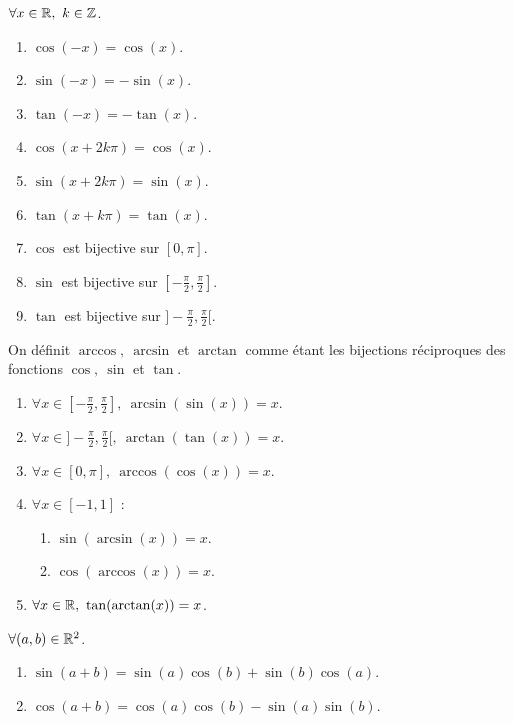 \begin{proposition}
	$\forall x \in \mathbb{R},\ k \in \mathbb{Z}$.
	\begin{enumerate}
		\item $\cos(-x) = \cos(x)$.
		\item $\sin(-x) = -\sin(x)$.
		\item $\tan(-x) = -\tan(x)$.
		\item $\cos(x + 2k\pi) = \cos(x)$.
		\item $\sin(x + 2k\pi) = \sin(x)$.
		\item $\tan(x + k\pi) = \tan(x)$.
		\item $\cos$ est bijective sur $[0, \pi]$.
		\item $\sin$ est bijective sur $[-\frac{\pi}{2}, \frac{\pi}{2}]$.
		\item $\tan$ est bijective sur $]-\frac{\pi}{2}, \frac{\pi}{2}[$.
	\end{enumerate}
\end{proposition}

\begin{definition}
	On définit $\arccos,\ \arcsin$ et $\arctan$ comme étant les bijections réciproques des fonctions $\cos,\ \sin$ et $\tan$.
\end{definition}

\begin{proposition}\leavevmode
    \begin{enumerate}
    	\item $\forall x \in [-\frac{\pi}{2}, \frac{\pi}{2}],\ \arcsin(\sin(x)) = x$.
        \item $\forall x \in ]-\frac{\pi}{2}, \frac{\pi}{2}[,\ \arctan(\tan(x)) = x$.
        \item $\forall x \in [0, \pi],\ \arccos(\cos(x)) = x$.
        \item $\forall x \in [-1, 1]$ :
        \begin{multicols}{2}
            \begin{enumerate}
                \item $\sin(\arcsin(x)) = x$.
                \item $\cos(\arccos(x)) = x$.
            \end{enumerate}
        \end{multicols}
        \item $\forall x \in \mathbb{R},\ \tan(\arctan(x)) = x$.
    \end{enumerate}
\end{proposition}

\begin{proposition}
	$\forall (a, b) \in \mathbb{R}^2$.
    \begin{multicols}{2}
        \begin{enumerate}
            \item $\sin(a + b) = \sin(a) \cos(b) + \sin(b) \cos(a)$.
            \item $\cos(a + b) = \cos(a) \cos(b) - \sin(a) \sin(b)$.
        \end{enumerate}
    \end{multicols}
\end{proposition}


